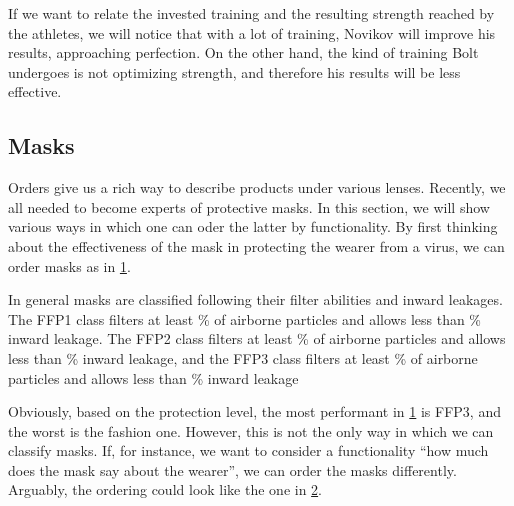 \begin{marginfigure}
	\centering
	\caption{}
	\label{fig:strong_training}
\end{marginfigure}

If we want to relate the invested training and the resulting strength reached by the athletes, we will notice that with a lot of training, Novikov will improve his results, approaching perfection.
On the other hand, the kind of training Bolt undergoes is not optimizing strength, and therefore his results will be less effective.


\subsection{Masks}

Orders give us a rich way to describe products under various lenses.
Recently, we all needed to become experts of protective masks.
In this section, we will show various ways in which one can oder the latter by functionality.
By first thinking about the effectiveness of the mask in protecting the wearer from a virus, we can order masks as in \cref{fig:masks_covid}.

\begin{figure}[h!]
	\centering
	\caption{}
	\label{fig:masks_covid}
\end{figure}

In general masks are classified following their filter abilities and inward leakages.
The FFP1 class filters at least \unit[80]{\%} of airborne particles and allows less than \unit[22]{\%} inward leakage.
The FFP2 class filters at least \unit[96]{\%} of airborne particles and allows less than \unit[8]{\%} inward leakage, and the FFP3 class filters at least \unit[99]{\%} of airborne particles and allows less than \unit[2]{\%} inward leakage

Obviously, based on the protection level, the most performant in \cref{fig:masks_covid} is FFP3, and the worst is the fashion one.
However, this is not the only way in which we can classify masks.
If, for instance, we want to consider a functionality ``how much does the mask say about the wearer'', we can order the masks differently.
Arguably, the ordering could look like the one in \cref{fig:masks_expressive}.

\begin{figure}[h!]
	\centering
	\caption{}
	\label{fig:masks_expressive}
\end{figure}

